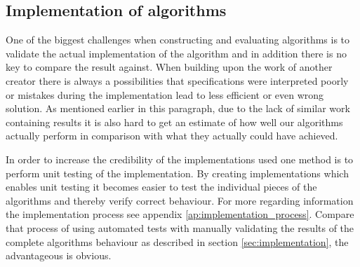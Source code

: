 \subsection{Implementation of algorithms }
One of the biggest challenges when constructing and evaluating algorithms is to validate the actual implementation of the algorithm and in addition there is no key to compare the result against. When building upon the work of another creator there is always a possibilities that specifications were interpreted poorly or mistakes during the implementation lead to less efficient or even wrong solution. As mentioned earlier in this paragraph, due to the lack of similar work containing results it is also hard to get an estimate of how well our algorithms actually perform in comparison with what they actually could have achieved. 

In order to increase the credibility of the implementations used one method is to perform unit testing of the implementation. By creating implementations which enables unit testing it becomes easier to test the individual pieces of the algorithms and thereby verify correct behaviour. For more regarding information the implementation process see appendix \ref{ap:implementation_process}. Compare that process of using automated tests with manually validating the results of the complete algorithms behaviour as described in section \ref{sec:implementation}, the advantageous is obvious. 
